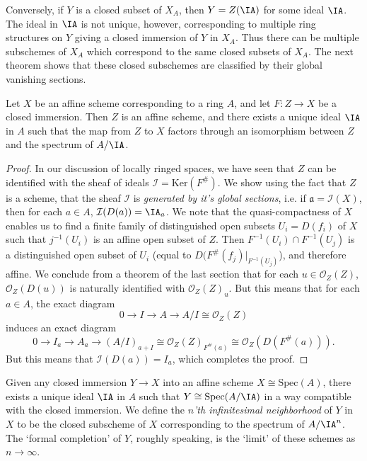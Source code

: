 Conversely, if $Y$ is a closed subset of $X_A$, then $Y = Z(\IA)$ for some ideal $\IA$. The ideal in $\IA$ is not unique, however, corresponding to multiple ring structures on $Y$ giving a closed immersion of $Y$ in $X_A$. Thus there can be multiple subschemes of $X_A$ which correspond to the same closed subsets of $X_A$. The next theorem shows that these closed subschemes are classified by their global vanishing sections.

\begin{theorem}
    Let $X$ be an affine scheme corresponding to a ring $A$, and let $F: Z \to X$ be a closed immersion. Then $Z$ is an affine scheme, and there exists a unique ideal $\IA$ in $A$ such that the map from $Z$ to $X$ factors through an isomorphism between $Z$ and the spectrum of $A/\IA$.
\end{theorem}
\begin{proof}
    In our discussion of locally ringed spaces, we have seen that $Z$ can be identified with the sheaf of ideals $\mathcal{I} = \text{Ker}(F^\#)$. We show using the fact that $Z$ is a scheme, that the sheaf $\mathcal{I}$ is \emph{generated by it's global sections}, i.e. if $\mathfrak{a} = \mathcal{I}(X)$, then for each $a \in A$, $\mathcal{I}(D(a)) = \IA_a$. We note that the quasi-compactness of $X$ enables us to find a finite family of distinguished open subsets $U_i = D(f_i)$ of $X$ such that $j^{-1}(U_i)$ is an affine open subset of $Z$. Then $F^{-1}(U_i) \cap F^{-1}(U_j)$ is a distinguished open subset of $U_i$ (equal to $D(F^\#(f_j)|_{F^{-1}(U_j)}$), and therefore affine. We conclude from a theorem of the last section that for each $u \in \mathcal{O}_Z(Z)$, $\mathcal{O}_Z(D(u))$ is naturally identified with $\mathcal{O}_Z(Z)_u$. But this means that for each $a \in A$, the exact diagram
    \[ 0 \to I \to A \to A/I \cong \mathcal{O}_Z(Z) \]
    induces an exact diagram
    \[ 0 \to I_a \to A_a \to (A/I)_{a + I} \cong \mathcal{O}_Z(Z)_{F^\#(a)} \cong \mathcal{O}_Z(D(F^\#(a))). \]
    But this means that $\mathcal{I}(D(a)) = I_a$, which completes the proof.
\end{proof}

\begin{example}
    Given any closed immersion $Y \to X$ into an affine scheme $X \cong \text{Spec}(A)$, there exists a unique ideal $\IA$ in $A$ such that $Y \cong \text{Spec}(A/\IA)$ in a way compatible with the closed immersion. We define the \emph{$n$'th infinitesimal neighborhood} of $Y$ in $X$ to be the closed subscheme of $X$ corresponding to the spectrum of $A/\IA^n$. The `formal completion' of $Y$, roughly speaking, is the `limit' of these schemes as $n \to \infty$.
\end{example}

